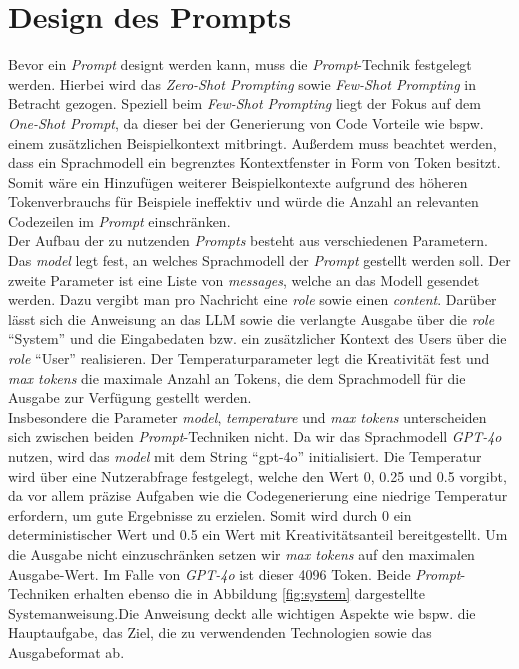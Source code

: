 \section{Design des Prompts}\label{section:prompt}
Bevor ein \textit{Prompt} designt werden kann, muss die \textit{Prompt}-Technik festgelegt werden. Hierbei wird das \textit{Zero-Shot Prompting} sowie \textit{Few-Shot Prompting} in Betracht gezogen. Speziell beim \textit{Few-Shot Prompting} liegt der Fokus auf dem \textit{One-Shot Prompt}, da dieser bei der Generierung von Code Vorteile wie bspw. einem zusätzlichen Beispielkontext mitbringt. Außerdem muss beachtet werden, dass ein Sprachmodell ein begrenztes Kontextfenster in Form von Token besitzt. Somit wäre ein Hinzufügen weiterer Beispielkontexte aufgrund des höheren Tokenverbrauchs für Beispiele ineffektiv und würde die Anzahl an relevanten Codezeilen im \textit{Prompt} einschränken.\\
Der Aufbau der zu nutzenden \textit{Prompts} besteht aus verschiedenen Parametern. Das \textit{model} legt fest, an welches Sprachmodell der \textit{Prompt} gestellt werden soll. Der zweite Parameter ist eine Liste von \textit{messages}, welche an das Modell gesendet werden. Dazu vergibt man pro Nachricht eine \textit{role} sowie einen \textit{content}. Darüber lässt sich die Anweisung an das LLM sowie die verlangte Ausgabe über die \textit{role} ``System'' und die Eingabedaten bzw. ein zusätzlicher Kontext des Users über die \textit{role} ``User'' realisieren. Der Temperaturparameter legt die Kreativität fest und \textit{max tokens} die maximale Anzahl an Tokens, die dem Sprachmodell für die Ausgabe zur Verfügung gestellt werden.\\
Insbesondere die Parameter \textit{model}, \textit{temperature} und \textit{max tokens} unterscheiden sich zwischen beiden \textit{Prompt}-Techniken nicht. Da wir das Sprachmodell \textit{GPT-4o} nutzen, wird das \textit{model} mit dem String ``gpt-4o'' initialisiert. Die Temperatur wird über eine Nutzerabfrage festgelegt, welche den Wert 0, 0.25 und 0.5 vorgibt, da vor allem präzise Aufgaben wie die Codegenerierung eine niedrige Temperatur erfordern, um gute Ergebnisse zu erzielen. \cite*{renzeEffectSamplingTemperature2024} Somit wird durch 0 ein deterministischer Wert und 0.5 ein Wert mit Kreativitätsanteil bereitgestellt. Um die Ausgabe nicht einzuschränken setzen wir \textit{max tokens} auf den maximalen Ausgabe-Wert. Im Falle von \textit{GPT-4o} ist dieser 4096 Token. Beide \textit{Prompt}-Techniken erhalten ebenso die in Abbildung \ref{fig:system} dargestellte Systemanweisung.Die Anweisung deckt alle wichtigen Aspekte wie bspw. die Hauptaufgabe, das Ziel, die zu verwendenden Technologien sowie das Ausgabeformat ab. \\
